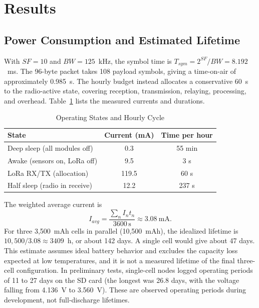 \documentclass[conference]{IEEEtran}
\begin{document}
\section{Results}\label{sec:results}
\subsection{Power Consumption and Estimated Lifetime}
With $SF=10$ and $BW=125$~kHz, the symbol time is $T_{sym}=2^{SF}/BW=8.192$~ms. The 96-byte packet takes 108 payload symbols, giving a time-on-air of approximately 0.985~s. The hourly budget instead allocates a conservative 60~s to the radio-active state, covering reception, transmission, relaying, processing, and overhead. Table~\ref{tab:modes} lists the measured currents and durations.

\begin{table}[t]
\caption{Operating States and Hourly Cycle}
\label{tab:modes}
\centering
\small
\begin{tabular}{@{}p{}cc@{}}
\toprule
State & Current (mA) & Time per hour \\
\midrule
Deep sleep (all modules off) & 0.3 & 55 min \\
Awake (sensors on, LoRa off) & 9.5 & 3 s \\
LoRa RX/TX (allocation) & 119.5 & 60 s \\
Half sleep (radio in receive) & 12.2 & 237 s \\
\bottomrule
\end{tabular}
\end{table}

The weighted average current is
\begin{equation}
I_{avg}=\frac{\sum_n I_n t_n}{3600\,\mathrm{s}}\approx 3.08\ \mathrm{mA}.
\end{equation}
For three 3,500~mAh cells in parallel (10,500~mAh), the idealized lifetime is $10{,}500/3.08\approx 3409$~h, or about 142 days. A single cell would give about 47 days. This estimate assumes ideal battery behavior and excludes the capacity loss expected at low temperatures, and it is not a measured lifetime of the final three-cell configuration. In preliminary tests, single-cell nodes logged operating periods of 11 to 27 days on the SD card (the longest was 26.8 days, with the voltage falling from 4.136~V to 3.560~V). These are observed operating periods during development, not full-discharge lifetimes.
\end{document}
